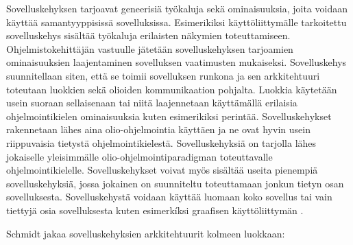 \documentclass[utf8]{gradu3}
\begin{document}
Sovelluskehyksen tarjoavat geneerisiä työkaluja sekä ominaisuuksia, joita voidaan käyttää samantyyppisissä sovelluksissa. Esimerikiksi käyttöliittymälle tarkoitettu sovelluskehys sisältää työkaluja erilaisten näkymien toteuttamiseen. Ohjelmistokehittäjän vastuulle jätetään sovelluskehyksen tarjoamien ominaisuuksien laajentaminen sovelluksen vaatimusten mukaiseksi. Sovelluskehys suunnitellaan siten, että se toimii sovelluksen runkona ja sen arkkitehtuuri toteutaan luokkien sekä olioiden kommunikaation pohjalta. Luokkia käytetään usein suoraan sellaisenaan tai niitä laajennetaan käyttämällä erilaisia ohjelmointikielen ominaisuuksia kuten esimerikiksi perintää. Sovelluskehykset rakennetaan lähes aina olio-ohjelmointia käyttäen ja ne ovat hyvin usein riippuvaisia tietystä ohjelmointikielestä. Sovelluskehyksiä on tarjolla lähes jokaiselle yleisimmälle olio-ohjelmointiparadigman toteuttavalle ohjelmointikielelle. Sovelluskehykset voivat myös sisältää useita pienempiä sovelluskehyksiä, jossa jokainen on suunniteltu toteuttamaan jonkun tietyn osan sovelluksesta. Sovelluskehystä voidaan käyttää luomaan koko sovellus tai vain tiettyjä osia sovelluksesta kuten esimerkíksi graafisen käyttöliittymän  \parencite[s. 431]{Sommerville}.

Schmidt \parencite{frameworks} jakaa sovelluskehyksien arkkitehtuurit kolmeen luokkaan:
\end{document}

